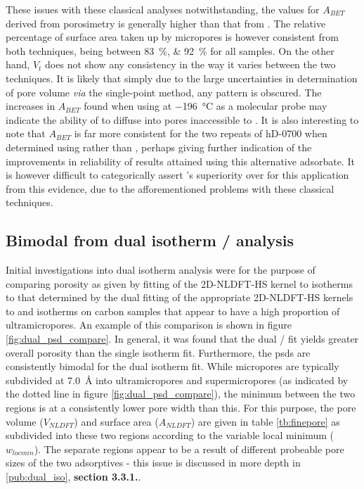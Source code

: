 These issues with these classical analyses notwithstanding, the values for $A_{BET}$ derived from  porosimetry is generally higher than that from . The relative percentage of surface area taken up by \glspl{micropore} is however consistent from both techniques, being between \qtylist[list-units=single]{83;92}{\percent} for all samples. On the other hand, $V_t$ does not show any consistency in the way it varies between the two techniques. It is likely that simply due to the large uncertainties in determination of pore volume \textit{via} the single-point method, any pattern is obscured. The increases in $A_{BET}$ found when using  at \qty{-196}{\degreeCelsius} as a molecular probe may indicate the ability of  to diffuse into pores inaccessible to . It is also interesting to note that $A_{BET}$ is far more consistent for the two repeats of hD-0700 when determined using  rather than , perhaps giving further indication of the improvements in reliability of results attained using this alternative \gls{adsorbate}. It is however difficult to categorically assert 's superiority over  for this application from this evidence, due to the afforementioned problems with these classical techniques. 
%
\subsection{\texorpdfstring{Bimodal  from dual isotherm / analysis}{Bimodal PSD from dual isotherm O2/H2 analysis}}%

Initial investigations into dual isotherm analysis were for the purpose of comparing porosity as given by fitting of the 2D-NLDFT-HS kernel to  isotherms to that determined by the dual fitting of the appropriate 2D-NLDFT-HS kernels to  and  isotherms on carbon samples that appear to have a high proportion of \glspl{ultramicropore}. An example of this comparison is shown in figure \ref{fig:dual_psd_compare}. In general, it was found that the dual / fit yields greater overall porosity than the single isotherm fit. Furthermore, the \acrshort{psd}s are consistently bimodal for the dual isotherm fit. While \glspl{micropore} are typically subdivided at \qty{7.0}{\angstrom} into \glspl{ultramicropore} and \glspl{supermicropore} (as indicated by the dotted line in figure \ref{fig:dual_psd_compare}), the minimum between the two regions is at a consistently lower pore width than this. For this purpose, the pore volume ($V_{NLDFT}$) and surface area ($A_{NLDFT}$) are given in table \ref{tb:finepore} as subdivided into these two regions according to the variable local minimum ($w_{locmin}$). The separate regions appear to be a result of different probeable pore sizes of the two adsorptives - this issue is discussed in more depth in \ref{pub:dual_iso}, \textbf{section 3.3.1.}. 

